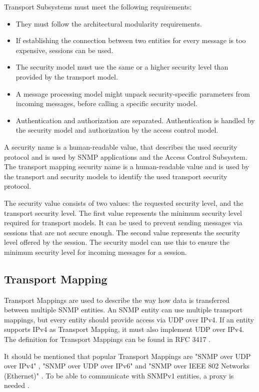 Transport Subsystems must meet the following requirements:
\begin{itemize}
    \item They must follow the architectural modularity requirements.
    \item If establishing the connection between two entities for every message is too expensive, sessions can be used.
    \item The security model must use the same or a higher security level than provided by the transport model.
    \item A message processing model might unpack security-specific parameters from incoming messages, before calling a specific security model.
    \item Authentication and authorization are separated. Authentication is handled by the security model and authorization by the access control model.
\end{itemize}

A security name is a human-readable value, that describes the used security protocol and is used by SNMP applications and the Access Control Subsystem. The transport mapping security name is a human-readable value and is used by the transport and security models to identify the used transport security protocol.

\newpage
The security value consists of two values: the requested security level, and the transport security level. The first value represents the minimum security level required for transport models. It can be used to prevent sending messages via sessions that are not secure enough. The second value represents the security level offered by the session. The security model can use this to ensure the minimum security level for incoming messages for a session.

\subsection{Transport Mapping}
\label{Section:SNMP-TransportMapping}

Transport Mappings are used to describe the way how data is transferred between multiple SNMP entities. An SNMP entity can use multiple transport mappings, but every entity should provide access via UDP over IPv4. If an entity supports IPv4 as Transport Mapping, it must also implement UDP over IPv4. The definition for Transport Mappings can be found in RFC 3417 \cite{RFC:RFC3147:2002}.

It should be mentioned that popular Transport Mappings are "SNMP over UDP over IPv4" \cite{RFC:RFC3147:2002}, "SNMP over UDP over IPv6" \cite{RFC:RFC3147:2002} and "SNMP over IEEE 802 Networks (Ethernet)" \cite{RFC:RFC4789:2006}. To be able to communicate with SNMPv1 entities, a proxy is needed \cite{RFC:RFC2576:2000}. 